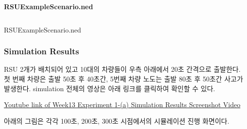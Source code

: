             \textbf{RSUExampleScenario.ned}
            
            \vspace{-2mm}
            \begin{listing}[h!]
                \inputminted[framerule = 1pt,framesep = 2mm , frame = lines, fontsize=\scriptsize]{c}{./code/week13/RSU.cpp}
                \vspace{-3mm}
                \caption{\footnotesize RSUExampleScenario.ned}
                \vspace{-3mm}
            \end{listing}
            \vspace{-6mm}
            
        \subsubsection*{Simulation Results}
            RSU 2개가 배치되어 있고 10대의 차량들이 우측 아래에서 20초 간격으로 출발한다. 첫 번째 차량은 출발 50초 후 40초간, 5번째 차량 노도는 출발 80초 후 50초간 사고가 발생한다. simulation 전체의 영상은 아래 링크를 클릭하여 확인할 수 있다.
            \vspace{-10mm}
                \begin{center}
                    \item \href{https://youtu.be/NtHc8h8PbeE}
        	        {Youtube link of Week13 Experiment 1-(a) Simulation Results Screenshot Video}
                \end{center}
            \vspace{-6mm}
\newpage

            아래의 그림은 각각 100초, 200초, 300초 시점에서의 시뮬레이션 진행 화면이다.
            
